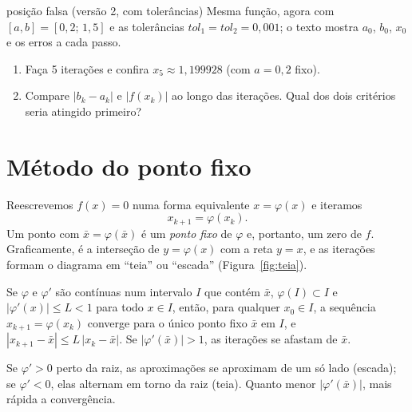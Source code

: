 \begin{atividade}{posição falsa (versão 2, com tolerâncias)}{\arqPosB}
Mesma função, agora com $[a,b]=[0{,}2;\,1{,}5]$ e as tolerâncias $tol_1=tol_2=0{,}001$; o texto
mostra $a_0$, $b_0$, $x_0$ e os erros a cada passo.
\begin{enumerate}[nosep]
  \item Faça 5 iterações e confira $x_5\approx1{,}199928$ (com $a=0{,}2$ fixo).
  \item Compare $|b_k-a_k|$ e $|f(x_k)|$ ao longo das iterações. Qual dos dois critérios seria
        atingido primeiro?
\end{enumerate}
\end{atividade}

\section{Método do ponto fixo}

Reescrevemos $f(x)=0$ numa forma equivalente $x=\varphi(x)$ e iteramos
\[
x_{k+1}=\varphi(x_k).
\]
Um ponto com $\bar x=\varphi(\bar x)$ é um \emph{ponto fixo} de $\varphi$ e, portanto, um zero
de $f$. Graficamente, é a interseção de $y=\varphi(x)$ com a reta $y=x$, e as iterações formam o
diagrama em ``teia'' ou ``escada'' (Figura~\ref{fig:teia}).

\begin{teorema}
Se $\varphi$ e $\varphi'$ são contínuas num intervalo $I$ que contém $\bar x$, $\varphi(I)\subset I$
e $|\varphi'(x)|\le L<1$ para todo $x\in I$, então, para qualquer $x_0\in I$, a sequência
$x_{k+1}=\varphi(x_k)$ converge para o único ponto fixo $\bar x$ em $I$, e
$|x_{k+1}-\bar x|\le L\,|x_k-\bar x|$.
Se $|\varphi'(\bar x)|>1$, as iterações se afastam de $\bar x$.
\end{teorema}

Se $\varphi'>0$ perto da raiz, as aproximações se aproximam de um só lado (escada); se
$\varphi'<0$, elas alternam em torno da raiz (teia). Quanto menor $|\varphi'(\bar x)|$, mais rápida
a convergência.


